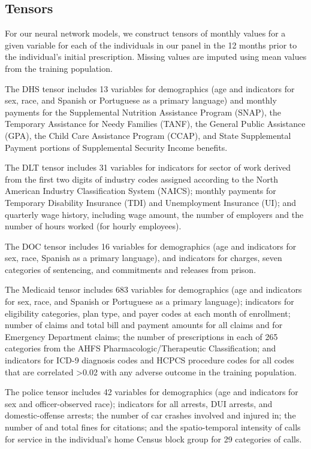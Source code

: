\documentclass[10pt, letter]{article}
\begin{document}
\subsection{Tensors}

For our neural network models, we construct tensors of monthly values for a given variable for each of the individuals in our panel in the 12 months prior to the individual's initial prescription. Missing values are imputed using mean values from the training population.

The DHS tensor includes 13 variables for demographics (age and indicators for sex, race, and Spanish or Portuguese as a primary language) and monthly payments for the Supplemental Nutrition Assistance Program (SNAP), the Temporary Assistance for Needy Families (TANF), the General Public Assistance (GPA), the Child Care Assistance Program (CCAP), and State Supplemental Payment portions of Supplemental Security Income benefits.

The DLT tensor includes 31 variables for indicators for sector of work derived from the first two digits of industry codes assigned according to the North American Industry Classification System (NAICS); monthly payments for Temporary Disability Insurance (TDI) and Unemployment Insurance (UI); and quarterly wage history, including wage amount, the number of employers and the number of hours worked (for hourly employees).

The DOC tensor includes 16 variables for demographics (age and indicators for sex, race, Spanish as a primary language), and indicators for charges, seven categories of sentencing, and commitments and releases from prison.

The Medicaid tensor includes 683 variables for demographics (age and indicators for sex, race, and Spanish or Portuguese as a primary language); indicators for eligibility categories, plan type, and payer codes at each month of enrollment; number of claims and total bill and payment amounts for all claims and for Emergency Department claims; the number of prescriptions in each of 265 categories from the AHFS Pharmacologic/Therapeutic Classification; and indicators for ICD-9 diagnosis codes and HCPCS procedure codes for all codes that are correlated >0.02 with any adverse outcome in the training population.

The police tensor includes 42 variables for demographics (age and indicators for sex and officer-observed race); indicators for all arrests, DUI arrests, and domestic-offense arrests; the number of car crashes involved and injured in; the number of and total fines for citations; and the spatio-temporal intensity of calls for service in the individual's home Census block group for 29 categories of calls.
\end{document}
